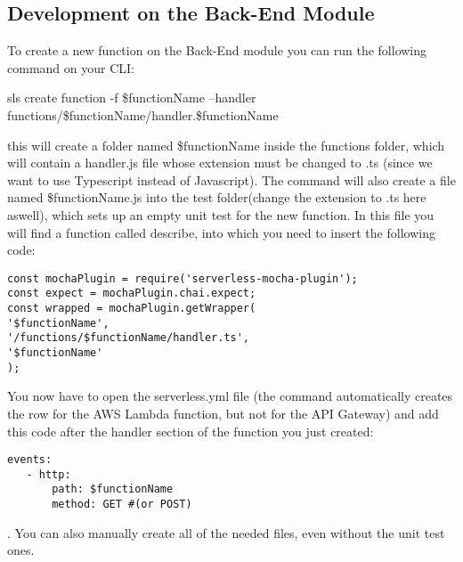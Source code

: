 \subsection{Development on the Back-End Module}
To create a new function on the Back-End module you can run the following command on your CLI: 
\begin{center}
sls create function -f \$functionName --handler functions/\$functionName/handler.\$functionName
\end{center}
this will create a folder named \$functionName inside the functions folder, which will contain a handler.js file whose extension must be changed to .ts (since we want to use Typescript instead of Javascript). 
The command will also create a file named \$functionName.js into the test folder(change the extension to .ts here aswell), which sets up an empty unit test for the new function.
In this file you will find a function called describe, into which you need to insert the following code:
\begin{lstlisting}
const mochaPlugin = require('serverless-mocha-plugin');
const expect = mochaPlugin.chai.expect;
const wrapped = mochaPlugin.getWrapper(
'$functionName', 
'/functions/$functionName/handler.ts',
'$functionName'
);
\end{lstlisting}
You now have to open the serverless.yml file (the command automatically creates the row for the AWS Lambda function, but not for the API Gateway) and add this code after the handler section of the function you just created:
\begin{lstlisting}
events:
   - http:
       path: $functionName
       method: GET #(or POST)
\end{lstlisting}.
You can also manually create all of the needed files, even without the unit test ones.